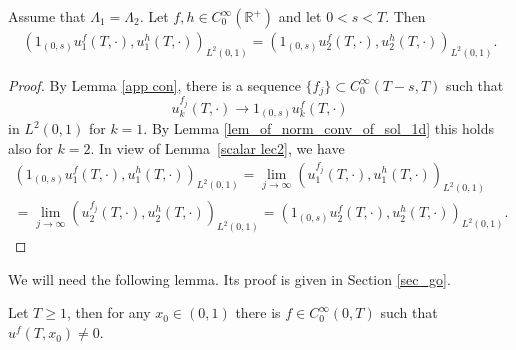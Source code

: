 \documentclass[12pt,oneside,final]{amsart}
\begin{document}
\begin{corollary}\label{cor_scalar_prod_supp}
	Assume that $\Lambda_1 = \Lambda_2$. Let $f, h \in C_0^\infty(\mathbb{R}^+)$ and let $0<s<T$. Then
	\begin{align}\label{scalar prod supp 0}
		\left(1_{(0,s)}u_1^f (T, \cdot), u_1^h (T, \cdot)\right)_{L^2(0,1)} =
		 \left(1_{(0,s)}u_2^f (T, \cdot), u_2^h (T, \cdot)\right)_{L^2(0,1)}.
	\end{align}
\end{corollary}
\begin{proof}
By Lemma \ref{app con}, there is a sequence $\{f_j\} \subset C_0^\infty(T - s, T)$ such that 
	\begin{equation*}
		u_k^{f_j} (T,\cdot) \rightarrow 1_{(0,s)}u_k^f (T, \cdot)
	\end{equation*}
in $L^2(0,1)$ for $k=1$. By Lemma \ref{lem_of_norm_conv_of_sol_1d}
this holds also for $k=2$. In view of Lemma~\ref{scalar lec2}, we have
\begin{multline*}
	\left(1_{(0,s)} u_1^{f}(T,\cdot), u_1^h(T,\cdot)\right)_{L^2(0,1)} = \lim_{j\rightarrow \infty}\left(u_1^{f_j}(T,\cdot), u_1^h(T,\cdot)\right)_{L^2(0,1)}\\
	= \lim_{j\rightarrow \infty}\left(u_2^{f_j}(T,\cdot), u_2^h(T,\cdot)\right)_{L^2(0,1)} = \left(1_{(0,s)} u_2^{f}(T,\cdot), u_2^h(T,\cdot)\right)_{L^2(0,1)}.
\end{multline*}
\end{proof}

We will need the following lemma. Its proof is given in Section \ref{sec_go}. 

\begin{lemma}\label{lem_nonvanishing}
	Let $T\geq 1$, then for any $x_0\in (0,1)$ there is $f\in C_0^\infty(0,T)$ such that $u^f(T,x_0) \neq 0$. 
\end{lemma}
\end{document}
